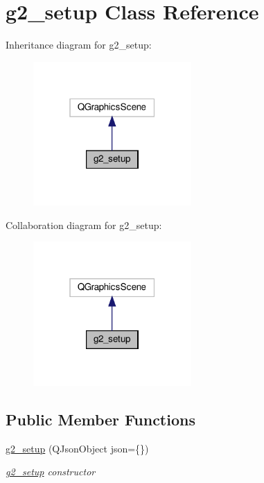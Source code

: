 \hypertarget{classg2__setup}{}\section{g2\+\_\+setup Class Reference}
\label{classg2__setup}


Inheritance diagram for g2\+\_\+setup\+:
\nopagebreak
\begin{figure}[H]
\begin{center}
\leavevmode
\includegraphics[width=171pt]{classg2__setup__inherit__graph}
\end{center}
\end{figure}


Collaboration diagram for g2\+\_\+setup\+:
\nopagebreak
\begin{figure}[H]
\begin{center}
\leavevmode
\includegraphics[width=171pt]{classg2__setup__coll__graph}
\end{center}
\end{figure}
\subsection*{Public Member Functions}
\begin{DoxyCompactItemize}
\item 
\hyperlink{classg2__setup_a1f4d4c1317565eb2bd9de3e2aa75f0a8}{g2\+\_\+setup} (Q\+Json\+Object json=\{\})
\begin{DoxyCompactList}\small\item\em \hyperlink{classg2__setup}{g2\+\_\+setup} constructor \end{DoxyCompactList}\end{DoxyCompactItemize}


